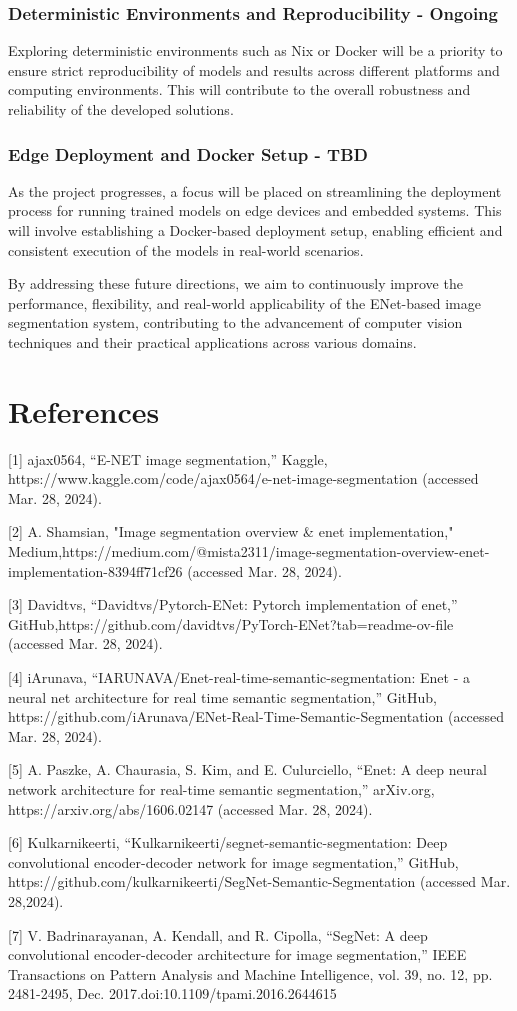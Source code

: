 \subsection{Deterministic Environments and Reproducibility - Ongoing}
Exploring deterministic environments such as Nix or Docker will be a priority to ensure strict reproducibility of models and results across different platforms and computing environments. This will contribute to the overall robustness and reliability of the developed solutions.
\subsection{Edge Deployment and Docker Setup - TBD}
As the project progresses, a focus will be placed on streamlining the deployment process for running trained models on edge devices and embedded systems. This will involve establishing a Docker-based deployment setup, enabling efficient and consistent execution of the models in real-world scenarios.

By addressing these future directions, we aim to continuously improve the performance, flexibility, and real-world applicability of the ENet-based image segmentation system, contributing to the advancement of computer vision techniques and their practical applications across various domains.

\chapter*{References}

 [1] ajax0564, “E-NET image segmentation,” Kaggle, https://www.kaggle.com/code/ajax0564/e-net-image-segmentation (accessed Mar. 28, 2024).

   [2] A. Shamsian, "Image segmentation overview \& enet implementation," Medium,https://medium.com/@mista2311/image-segmentation-overview-enet-implementation-8394ff71cf26 (accessed Mar. 28, 2024).

   [3] Davidtvs, “Davidtvs/Pytorch-ENet: Pytorch implementation of enet,” GitHub,https://github.com/davidtvs/PyTorch-ENet?tab=readme-ov-file (accessed Mar. 28, 2024).

   [4] iArunava, “IARUNAVA/Enet-real-time-semantic-segmentation: Enet - a neural net architecture for real time semantic segmentation,” GitHub, https://github.com/iArunava/ENet-Real-Time-Semantic-Segmentation (accessed Mar. 28, 2024).

   [5] A. Paszke, A. Chaurasia, S. Kim, and E. Culurciello, “Enet: A deep neural network architecture for real-time semantic segmentation,” arXiv.org, https://arxiv.org/abs/1606.02147 (accessed Mar. 28, 2024).

   [6] Kulkarnikeerti, “Kulkarnikeerti/segnet-semantic-segmentation: Deep convolutional encoder-decoder network for image segmentation,” GitHub, https://github.com/kulkarnikeerti/SegNet-Semantic-Segmentation (accessed Mar. 28,2024).

   [7] V. Badrinarayanan, A. Kendall, and R. Cipolla, “SegNet: A deep convolutional encoder-decoder architecture for image segmentation,” IEEE Transactions on Pattern Analysis and Machine Intelligence, vol. 39, no. 12, pp. 2481-2495, Dec. 2017.doi:10.1109/tpami.2016.2644615
